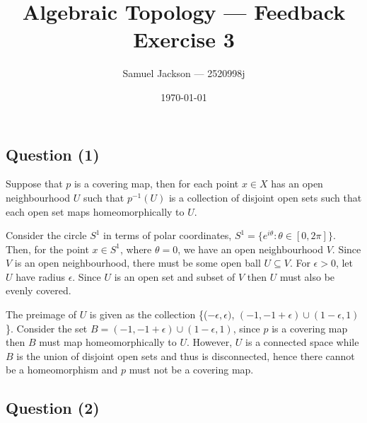 \documentclass{article}
\title{Algebraic Topology  --- Feedback Exercise 3}
\author{Samuel Jackson --- 2520998j}
\date{\today}
\begin{document}
\maketitle

\newcommand{\R}{\mathbb{R}}
\newcommand{\Z}{\mathbb{Z}}
\newcommand{\N}{\mathbb{N}}
\newcommand{\pind}{p_{\ast}}

\begin{center}
    \section*{Question (1)}
\end{center}

\begin{flushleft}
    Suppose that $p$ is a covering map, then for each point $x \in X$ has an open neighbourhood $U$ such that $p^{-1}(U)$ is a collection of disjoint open sets such that each open set maps homeomorphically to $U$. \newline

    Consider the circle $S^1$ in terms of polar coordinates, $S^1 = \{e^{i\theta} : \theta \in [0, 2\pi] \}$. Then, for the point $x \in S^1$, where $\theta = 0$, we have an open neighbourhood $V$. Since $V$ is an open neighbourhood, there must be some open ball $U \subseteq V$. For $\epsilon > 0$, let $U$ have radius $\epsilon$. Since $U$ is an open set and subset of $V$ then $U$ must also be evenly covered. \newline

    The preimage of $U$ is given as the collection \{($-\epsilon, \epsilon)$, $(-1, -1+\epsilon) \cup (1 - \epsilon, 1)$\}. Consider the set $B = (-1, -1+\epsilon) \cup (1 - \epsilon, 1)$, since $p$ is a covering map then $B$ must map homeomorphically to $U$. However, $U$ is a connected space while $B$ is the union of disjoint open sets and thus is disconnected, hence there cannot be a homeomorphism and $p$ must not be a covering map.
\end{flushleft}
\begin{center}
    \section*{Question (2)}
\end{center}
\end{document}
